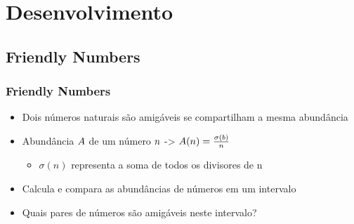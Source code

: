 \documentclass[xcolor={table}]{beamer}
\begin{document}
\section{Desenvolvimento}
\subsection{Friendly Numbers}
\begin{frame}\frametitle{Friendly Numbers}
    \begin{itemize}
        \item Dois números naturais são amigáveis se compartilham a mesma abundância
        \item {Abundância $\mathnormal{A}$ de um número $\mathnormal{n}$ -> $\mathnormal{A(n) = \frac{\sigma(b)}{n}}$}
        \begin{itemize}
            \item {$\sigma(n)$ representa a soma de todos os divisores de n}
        \end{itemize}
        \item Calcula e compara as abundâncias de números em um intervalo
        \item Quais pares de números são amigáveis neste intervalo?
    \end{itemize}
\end{frame}
\end{document}

